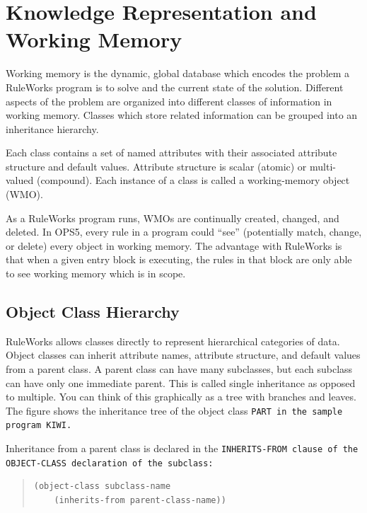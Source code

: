 \chapter[Working Memory]{Knowledge Representation and 
  Working Memory}
\label{c:workingmem}

Working memory is the dynamic, global database which encodes
the problem a RuleWorks program is to solve and the current
state of the solution. Different aspects of the problem are
organized into different classes of information in working
memory. Classes which store related information can be
grouped into an inheritance hierarchy.

Each class contains a set of named attributes with their
associated attribute structure and default values. Attribute
structure is scalar (atomic) or multi-valued (compound). Each
instance of a class is called a working-memory object (WMO).

As a RuleWorks program runs, WMOs are continually created,
changed, and deleted. In OPS5, every rule in a program could
``see'' (potentially match, change, or delete) every object in
working memory. The advantage with RuleWorks is that when a
given entry block is executing, the rules in that block are
only able to see working memory which is in scope.

\section{Object Class Hierarchy}

RuleWorks allows classes directly to represent hierarchical
categories of data. Object classes can inherit attribute
names, attribute structure, and default values from a parent
class. A parent class can have many subclasses, but each
subclass can have only one immediate parent. This is called
single inheritance as opposed to multiple. You can think of
this graphically as a tree with branches and leaves. The
figure shows the inheritance tree of the object class \tt{PART} in
the sample program \tt{KIWI}.

Inheritance from a parent class is declared in the
\tt{INHERITS-FROM} clause of the \tt{OBJECT-CLASS} declaration of the
subclass:

\begin{quote}
\begin{verbatim}
(object-class subclass-name
    (inherits-from parent-class-name))
\end{verbatim}
\end{quote}
  
